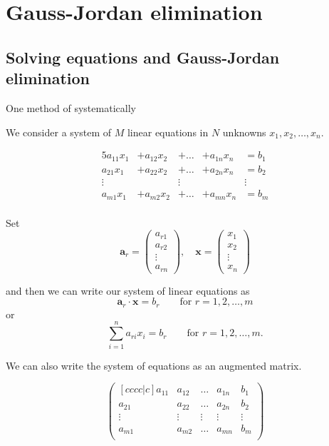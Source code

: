 \chapter{Gauss-Jordan elimination}

\section{Solving equations and Gauss-Jordan elimination}

One method of systematically 

We consider a system of $M$ linear equations in $N$ unknowns $x_1,x_2,\ldots,x_n$.

\begin{alignat*}{5}
    a_{11}x_1&+a_{12}x_2&+\ldots&+a_{1n}x_n&=b_1\\
    a_{21}x_1&+a_{22}x_2&+\ldots&+a_{2n}x_n&=b_2\\
    \vdots && \vdots && \vdots \\
    a_{m1}x_1&+a_{m2}x_2&+\ldots&+a_{mn}x_n&=b_m\\
\end{alignat*}

Set 
\[
    \bm a_r=
    \begin{pmatrix}
        a_{r1}\\
        a_{r2}\\
        \vdots\\
        a_{rn}
    \end{pmatrix}
    ,\quad\bm x=
    \begin{pmatrix}
        x_1\\
        x_2\\
        \vdots\\
        x_n
    \end{pmatrix}
\]

and then we can write our system of linear equations as \[\bm a_r\cdot\bm x=b_r\qquad\text{for }r=1,2,\ldots,m\] or \[\sum_{i=1}^na_{ri}x_i=b_r\qquad\text{for }r=1,2,\ldots,m.\]

We can also write the system of equations as an augmented matrix.

\[
    \begin{pmatrix}[cccc|c]
        a_{11}&a_{12}&\ldots&a_{1n}&b_1\\
        a_{21}&a_{22}&\ldots&a_{2n}&b_2\\
        \vdots&\vdots&\vdots&\vdots&\vdots\\
        a_{m1}&a_{m2}&\ldots&a_{mn}&b_m\\
    \end{pmatrix}
\]

